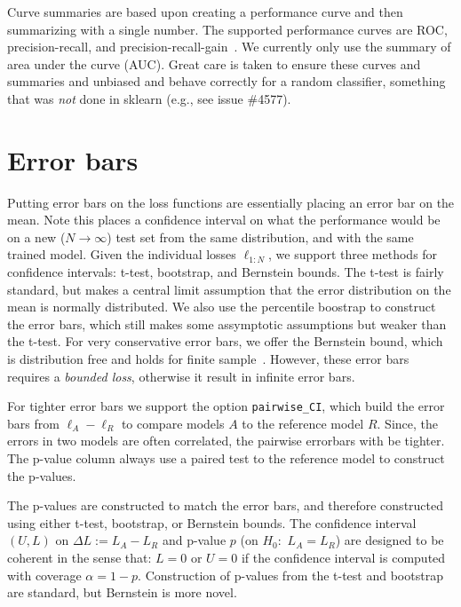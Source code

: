 \documentclass{article}
\newcommand{\code}{\texttt}
\begin{document}
Curve summaries are based upon creating a performance curve and then summarizing with a single number.
The supported performance curves are ROC, precision-recall, and precision-recall-gain~\citep{Flach2015}.
We currently only use the summary of area under the curve (AUC)\@.
Great care is taken to ensure these curves and summaries and unbiased and behave correctly for a random classifier, something that was \emph{not} done in sklearn (e.g., see issue \#4577)\@.

\section{Error bars}

Putting error bars on the loss functions are essentially placing an error bar on the mean.
Note this places a confidence interval on what the performance would be on a new ($N \rightarrow \infty$) test set from the same distribution, and with the same trained model.
Given the individual losses $\ell_{1:N}$, we support three methods for confidence intervals: t-test, bootstrap, and Bernstein bounds.
The t-test is fairly standard, but makes a central limit assumption that the error distribution on the mean is normally distributed.
We also use the percentile boostrap to construct the error bars, which still makes some assymptotic assumptions but weaker than the t-test.
For very conservative error bars, we offer the Bernstein bound, which is distribution free and holds for finite sample~\citep{Audibert2009}.
However, these error bars requires a \emph{bounded loss}, otherwise it result in infinite error bars.

For tighter error bars we support the option \code{pairwise\_CI}, which build the error bars from $\ell_A - \ell_R$ to compare models $A$ to the reference model $R$.
Since, the errors in two models are often correlated, the pairwise errorbars with be tighter.
The p-value column always use a paired test to the reference model to construct the p-values.

The p-values are constructed to match the error bars, and therefore constructed using either t-test, bootstrap, or Bernstein bounds.
The confidence interval $(U,L)$ on $\Delta L := L_A - L_R$ and p-value $p$ (on $H_0$:~$L_A = L_R$) are designed to be coherent in the sense that: $L = 0$ or $U = 0$ if the confidence interval is computed with coverage $\alpha=1-p$.
Construction of p-values from the t-test and bootstrap are standard, but Bernstein is more novel.
\end{document}
